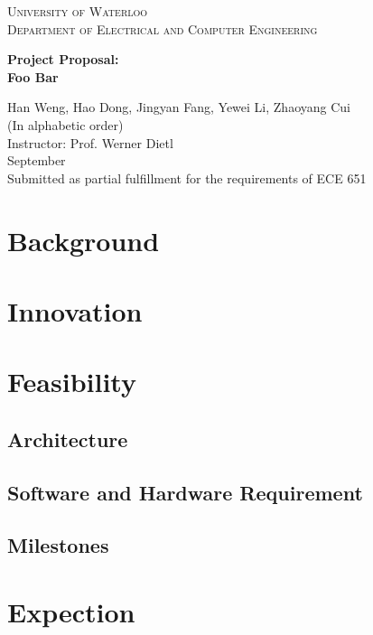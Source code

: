\documentclass[12pt]{article}
\begin{document}
\begin{titlepage}
	\begin{center}
		{\hphantom{M}}
		\vspace{1cm}
		{\scshape\Huge{University of Waterloo}}\\
		\vspace{2cm}
		{\scshape\Large Department of Electrical and Computer Engineering}\\
		\vspace{1.5cm}
		\begin{spacing}{2.5}
		{\LARGE\bfseries Project Proposal:\\ Foo Bar}\\
		\end{spacing}
		\vspace{2cm}
		{\Large{Han Weng, Hao Dong, Jingyan Fang, Yewei Li, Zhaoyang Cui\\ (In alphabetic order) \vspace{1em} \\ Instructor: Prof. Werner Dietl}}
		\vspace{1cm}\\
		{\Large September}\\
		\vspace{4em}
		{\Large Submitted as partial fulfillment for the requirements of ECE 651}
	\end{center}
\end{titlepage}

\begin{spacing}{1.5}
\large
\tableofcontents
\end{spacing}
\newpage

\section{Background}

\section{Innovation}

\section{Feasibility}
\subsection{Architecture}
\subsection{Software and Hardware Requirement}
\subsection{Milestones}

\section{Expection}
\end{document}
